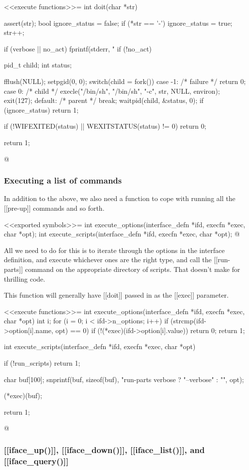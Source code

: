 \documentclass{article}
\begin{document}
<<execute functions>>=
int doit(char *str) {
	assert(str);
	bool ignore_status = false;
	if (*str == '-') {
	    ignore_status = true;
	    str++;
	}

	if (verbose || no_act) {
		fprintf(stderr, "%
	}
	if (!no_act) {
		pid_t child;
		int status;

		fflush(NULL);
		setpgid(0, 0);
		switch(child = fork()) {
		    case -1: /* failure */
			return 0;
		    case 0: /* child */
			execle("/bin/sh", "/bin/sh", "-c", str, NULL, environ);
			exit(127);
		    default: /* parent */
		    	break;
		}
		waitpid(child, &status, 0);
		if (ignore_status)
			return 1;

		if (!WIFEXITED(status) || WEXITSTATUS(status) != 0)
			return 0;
	}
	return 1;
}
@

\subsubsection{Executing a list of commands}

In addition to the above, we also need a function to cope with running
all the [[pre-up]] commands and so forth.

<<exported symbols>>=
int execute_options(interface_defn *ifd, execfn *exec, char *opt);
int execute_scripts(interface_defn *ifd, execfn *exec, char *opt);
@ 

All we need to do for this is to iterate through the options in the
interface definition, and execute whichever ones are the right type,
and call the [[run-parts]] command on the appropriate directory of
scripts. That doesn't make for thrilling code.

This function will generally have [[doit]] passed in as the [[exec]]
parameter.

<<execute functions>>=
int execute_options(interface_defn *ifd, execfn *exec, char *opt) {
	int i;
	for (i = 0; i < ifd->n_options; i++) {
		if (strcmp(ifd->option[i].name, opt) == 0) {
			if (!(*exec)(ifd->option[i].value)) {
				return 0;
			}
		}
	}
	return 1;
}

int execute_scripts(interface_defn *ifd, execfn *exec, char *opt) {
	if (!run_scripts) return 1;

	char buf[100];
	snprintf(buf, sizeof(buf), "run-parts %
		verbose ? "--verbose" : "", opt);

	(*exec)(buf); 

	return 1;
}
@ 

\subsubsection{[[iface_up()]], [[iface_down()]], [[iface_list()]], and [[iface_query()]]}
\end{document}
